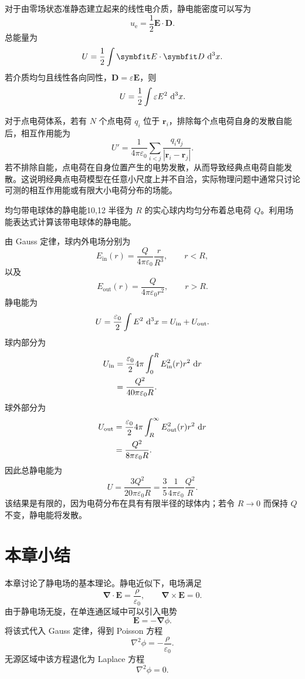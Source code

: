 对于由零场状态准静态建立起来的线性电介质，静电能密度可以写为
\[
u_{\mathrm{e}}
=
\frac{1}{2}
\bm{E}\cdot\bm{D}.
\]
总能量为
\[
U
=
\frac{1}{2}
\int
\bm{E}\cdot\bm{D}\,\dif^{3}x.
\]
若介质均匀且线性各向同性，$\bm{D}=\varepsilon\bm{E}$，则
\[
U
=
\frac{1}{2}
\int
\varepsilon E^{2}\,\mathop{}\!\mathrm{d}^{3}x.
\]

对于点电荷体系，若有 $N$ 个点电荷 $q_{i}$ 位于 $\bm{r}_{i}$，排除每个点电荷自身的发散自能后，相互作用能为
\[
U'
=
\frac{1}{4\pi\varepsilon_{0}}
\sum_{i<j}
\frac{q_{i}q_{j}}{|\bm{r}_{i}-\bm{r}_{j}|}.
\]
若不排除自能，点电荷在自身位置产生的电势发散，从而导致经典点电荷自能发散。这说明经典点电荷模型在任意小尺度上并不自洽，实际物理问题中通常只讨论可测的相互作用能或有限大小电荷分布的场能。

\begin{example}{均匀带电球体的静电能}{10,12}
半径为 $R$ 的实心球内均匀分布着总电荷 $Q$。利用场能表达式计算该带电球体的静电能。

\begin{solution}
由 Gauss 定律，球内外电场分别为
\[
E_{\mathrm{in}}(r)
=
\frac{Q}{4\pi\varepsilon_{0}}
\frac{r}{R^{3}},
\qquad
r<R,
\]
以及
\[
E_{\mathrm{out}}(r)
=
\frac{Q}{4\pi\varepsilon_{0}r^{2}},
\qquad
r>R.
\]
静电能为
\[
U
=
\frac{\varepsilon_{0}}{2}
\int E^{2}\,\mathop{}\!\mathrm{d}^{3}x
=
U_{\mathrm{in}}+U_{\mathrm{out}}.
\]
球内部分为
\[
\begin{aligned}
U_{\mathrm{in}}
&=
\frac{\varepsilon_{0}}{2}
4\pi
\int_{0}^{R}
E_{\mathrm{in}}^{2}(r)r^{2}\,\mathop{}\!\mathrm{d} r\\
&=
\frac{Q^{2}}{40\pi\varepsilon_{0}R}.
\end{aligned}
\]
球外部分为
\[
\begin{aligned}
U_{\mathrm{out}}
&=
\frac{\varepsilon_{0}}{2}
4\pi
\int_{R}^{\infty}
E_{\mathrm{out}}^{2}(r)r^{2}\,\mathop{}\!\mathrm{d} r\\
&=
\frac{Q^{2}}{8\pi\varepsilon_{0}R}.
\end{aligned}
\]
因此总静电能为
\[
U
=
\frac{3Q^{2}}{20\pi\varepsilon_{0}R}
=
\frac{3}{5}
\frac{1}{4\pi\varepsilon_{0}}
\frac{Q^{2}}{R}.
\]
该结果是有限的，因为电荷分布在具有有限半径的球体内；若令 $R\to 0$ 而保持 $Q$ 不变，静电能将发散。
\end{solution}
\end{example}

\section{本章小结}

本章讨论了静电场的基本理论。静电近似下，电场满足
\[
\bm{\nabla}\cdot\bm{E}
=
\frac{\rho}{\varepsilon_{0}},
\qquad
\bm{\nabla}\times\bm{E}=0.
\]
由于静电场无旋，在单连通区域中可以引入电势
\[
\bm{E}
=
-\bm{\nabla}\phi.
\]
将该式代入 Gauss 定律，得到 Poisson 方程
\[
\nabla^{2}\phi
=
-\frac{\rho}{\varepsilon_{0}}.
\]
无源区域中该方程退化为 Laplace 方程
\[
\nabla^{2}\phi=0.
\]

